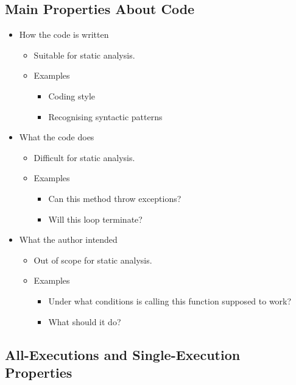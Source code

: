 \documentclass{article}
\begin{document}
\subsection{Main Properties About Code}

\begin{itemize}
    \item How the code is written
    \begin{itemize}
        \item Suitable for static analysis.
        \item Examples
        \begin{itemize}
            \item Coding style
            \item Recognising syntactic patterns
        \end{itemize}
    \end{itemize}
    \item What the code does
    \begin{itemize}
        \item Difficult for static analysis.
        \item Examples
        \begin{itemize}
            \item Can this method throw exceptions?
            \item Will this loop terminate?
        \end{itemize}
    \end{itemize}
    \item What the author intended
    \begin{itemize}
        \item Out of scope for static analysis.
        \item Examples
        \begin{itemize}
            \item Under what conditions is calling this function supposed to work?
            \item What should it do?
        \end{itemize}
    \end{itemize}
\end{itemize}

\subsection{All-Executions and Single-Execution Properties}
\end{document}
